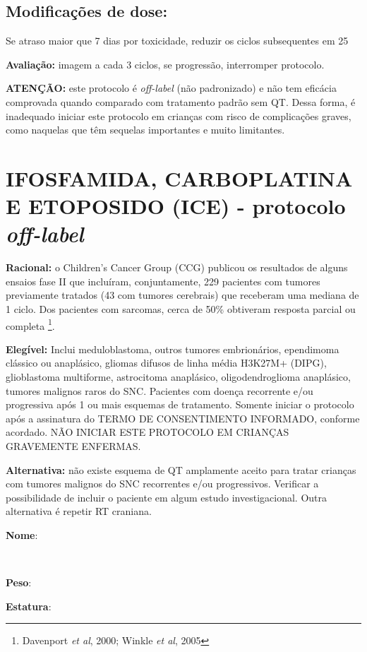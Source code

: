 \documentclass[11pt,a4paper,oldfontcommands]{memoir}
\def\entrywithlabel[#1]#2{\parbox{#1}{{\small #2:} \hrulefill}}
\begin{document}
\subsection{Modificações de dose:}
Se atraso maior que 7 dias por toxicidade, reduzir os ciclos subsequentes em 25%

\textbf{Avaliação:} imagem a cada 3 ciclos, se progressão, interromper protocolo.

\textbf{ATENÇÃO:} este protocolo é \textit{off-label} (não padronizado) e não tem eficácia comprovada quando comparado com tratamento padrão sem QT. Dessa forma, é inadequado iniciar este protocolo em crianças com risco de complicações graves, como naquelas que têm sequelas importantes e muito limitantes.
\cleardoublepage

\section{IFOSFAMIDA, CARBOPLATINA E ETOPOSIDO (ICE) - protocolo \textit{off-label}}
{\let\thefootnote\relax{}}
\textbf{Racional:} o Children's Cancer Group (CCG) publicou os resultados de alguns ensaios fase II que incluíram, conjuntamente, 229 pacientes com tumores previamente tratados (43 com tumores cerebrais) que receberam uma mediana de 1 ciclo. Dos pacientes com sarcomas, cerca de 50\% obtiveram resposta parcial ou completa \footnote{Davenport \textit{et al}, 2000; Winkle \textit{et al}, 2005}.

\textbf{Elegível:} Inclui meduloblastoma, outros tumores embrionários, ependimoma clássico ou anaplásico, gliomas difusos de linha média H3K27M+ (DIPG), glioblastoma multiforme, astrocitoma anaplásico, oligodendroglioma anaplásico, tumores malignos raros do SNC. Pacientes com doença recorrente e/ou progressiva após 1 ou mais esquemas de tratamento. Somente iniciar o protocolo após a assinatura do TERMO DE CONSENTIMENTO INFORMADO, conforme acordado. NÃO INICIAR ESTE PROTOCOLO EM CRIANÇAS GRAVEMENTE ENFERMAS.

\textbf{Alternativa:} não existe esquema de QT amplamente aceito para tratar crianças com tumores malignos do SNC recorrentes e/ou progressivos. Verificar a possibilidade de incluir o paciente em algum estudo investigacional. Outra alternativa é repetir RT craniana.
\\[0.4cm]
\entrywithlabel[1\hsize]{\textbf{Nome}}\hfill
\\[0.3cm]
\entrywithlabel[.45\hsize]{\textbf{Peso}}\hfill  \entrywithlabel[.45\hsize]{\textbf{Estatura}}
\end{document}
